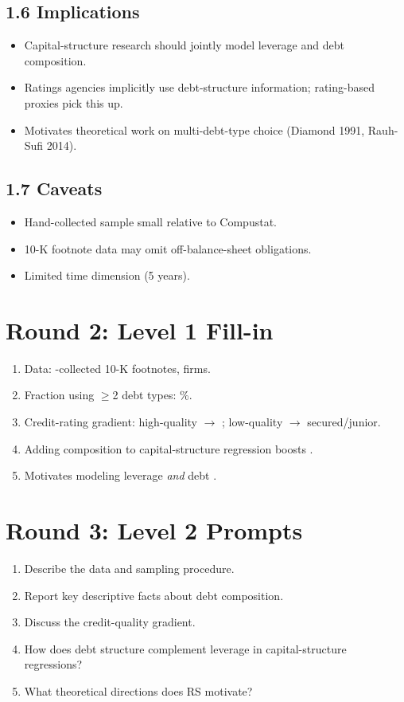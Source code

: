 \documentclass[11pt]{article}
\newcommand{\blank}[1]{\underline{\hspace{#1}}}
\begin{document}
\subsection*{1.6 Implications}
\begin{itemize}
\item Capital-structure research should jointly model leverage and debt composition.
\item Ratings agencies implicitly use debt-structure information; rating-based proxies pick this up.
\item Motivates theoretical work on multi-debt-type choice (Diamond 1991, Rauh-Sufi 2014).
\end{itemize}

\subsection*{1.7 Caveats}
\begin{alertbox}
\begin{itemize}
\item Hand-collected sample small relative to Compustat.
\item 10-K footnote data may omit off-balance-sheet obligations.
\item Limited time dimension (5 years).
\end{itemize}
\end{alertbox}

\section*{Round 2: Level 1 Fill-in}
\begin{enumerate}
\item Data: \blank{2cm}-collected 10-K footnotes, \blank{1cm} firms.
\item Fraction using $\geq$2 debt types: \blank{1cm}\%.
\item Credit-rating gradient: high-quality $\to$ \blank{2cm}; low-quality $\to$ secured/junior.
\item Adding composition to capital-structure regression boosts \blank{2cm}.
\item Motivates modeling leverage \emph{and} debt \blank{2cm}.
\end{enumerate}

\section*{Round 3: Level 2 Prompts}
\begin{enumerate}
\item Describe the data and sampling procedure.
\item Report key descriptive facts about debt composition.
\item Discuss the credit-quality gradient.
\item How does debt structure complement leverage in capital-structure regressions?
\item What theoretical directions does RS motivate?
\end{enumerate}
\end{document}
